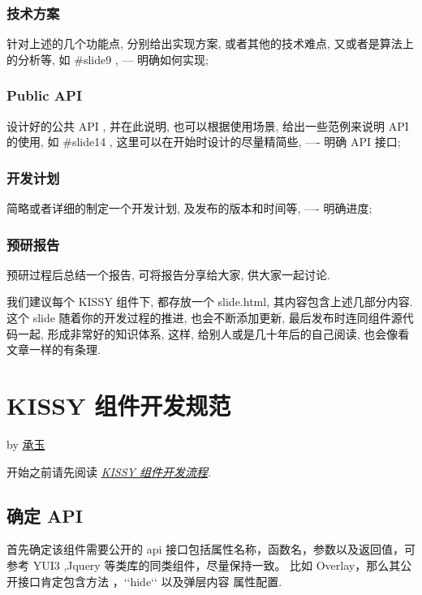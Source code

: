 \documentclass[letterpaper,10pt,english]{sphinxmanual}
\begin{document}
\subsubsection{技术方案}
\label{workflow/workflow-full:id6}
针对上述的几个功能点, 分别给出实现方案, 或者其他的技术难点, 又或者是算法上的分析等, 如 \#slide9 , --- 明确如何实现;


\subsubsection{Public API}
\label{workflow/workflow-full:public-api}
设计好的公共 API , 并在此说明, 也可以根据使用场景, 给出一些范例来说明 API 的使用, 如 \#slide14 , 这里可以在开始时设计的尽量精简些, ---- 明确 API 接口;


\subsubsection{开发计划}
\label{workflow/workflow-full:id7}
简略或者详细的制定一个开发计划, 及发布的版本和时间等, ---- 明确进度;


\subsubsection{预研报告}
\label{workflow/workflow-full:id8}
预研过程后总结一个报告, 可将报告分享给大家, 供大家一起讨论.

我们建议每个 KISSY 组件下, 都存放一个 slide.html, 其内容包含上述几部分内容. 这个 slide 随着你的开发过程的推进, 也会不断添加更新, 最后发布时连同组件源代码一起, 形成非常好的知识体系, 这样, 给别人或是几十年后的自己阅读, 也会像看文章一样的有条理.


\section{KISSY 组件开发规范}
\label{workflow/dev-spec:workflow-dev-spec}\label{workflow/dev-spec::doc}\label{workflow/dev-spec:kissy}
by \href{mailto:yiminghe@gmail.com}{承玉}

开始之前请先阅读 {\hyperref[workflow/workflow-simple:workflow-simple]{\emph{KISSY 组件开发流程}}}.


\subsection{确定 API}
\label{workflow/dev-spec:api}
首先确定该组件需要公开的 api 接口包括属性名称，函数名，参数以及返回值，可参考 YUI3 ,Jquery 等类库的同类组件，尽量保持一致。
比如 Overlay，那么其公开接口肯定包含方法  ，{}`{}`hide{}`{}` 以及弹层内容  属性配置.
\end{document}
